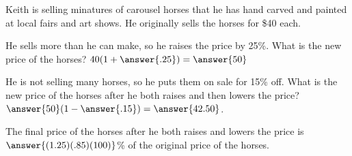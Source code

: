 \documentclass{ximera}
\author{Elizabeth Miller}
\begin{document}
Keith is selling minatures of carousel horses that he has hand carved and painted at local fairs and art shows.  He originally sells the horses for \$40 each.  
\begin{exercise}
He sells more than he can make, so he raises the price by 25\%.  What is the new price of the horses?  $40(1+\answer{.25})=\answer{50}$
\end{exercise}
\begin{exercise}
He is not selling many horses, so he puts them on sale for 15\% off.  What is the new price of the horses after he both raises and then lowers the price?  $\answer{50}(1-\answer{.15})=\answer{42.50}$.  
\end{exercise}
\begin{exercise}
The final price of the horses after he both raises and lowers the price is $\answer{(1.25)(.85)(100)}$\% of the original price of the horses.
\end{exercise}
\end{document}
